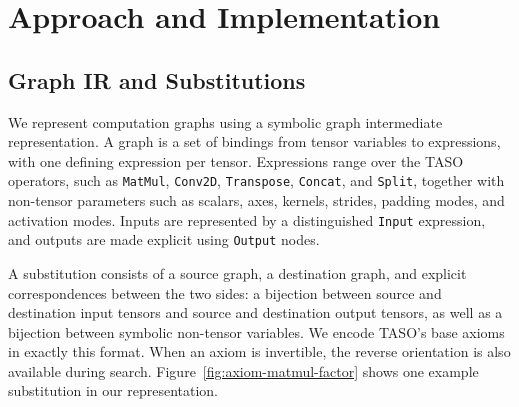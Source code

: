 \documentclass[sigplan,10pt,nonacm]{acmart}
\begin{document}




\section{Approach and Implementation}
\label{sec:approach}

\subsection{Graph IR and Substitutions}

We represent computation graphs using a symbolic graph intermediate representation. A graph is a set of bindings from tensor variables to expressions, with one defining expression per tensor. Expressions range over the TASO operators, such as \texttt{MatMul}, \texttt{Conv2D}, \texttt{Transpose}, \texttt{Concat}, and \texttt{Split}, together with non-tensor parameters such as scalars, axes, kernels, strides, padding modes, and activation modes. Inputs are represented by a distinguished \texttt{Input} expression, and outputs are made explicit using \texttt{Output} nodes.

A substitution consists of a source graph, a destination graph, and explicit correspondences between the two sides: a bijection between source and destination input tensors and source and destination output tensors, as well as a bijection between symbolic non-tensor variables. We encode TASO's base axioms in exactly this format. When an axiom is invertible, the reverse orientation is also available during search. Figure~\ref{fig:axiom-matmul-factor} shows one example substitution in our representation.
\end{document}

